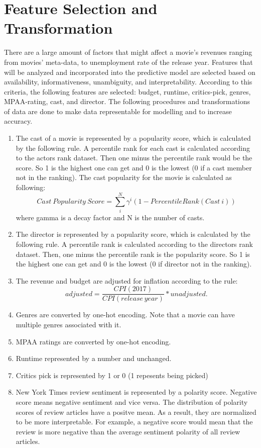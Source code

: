 \documentclass[11pt]{article}
\begin{document}
\section{Feature Selection and
Transformation}\label{feature-selection-and-transformation}

There are a large amount of factors that might affect a movie's revenues
ranging from movies' meta-data, to unemployment rate of the release
year. Features that will be analyzed and incorporated into the
predictive model are selected based on availability, informativeness,
unambiguity, and interpretability. According to this criteria, the
following features are selected: budget, runtime, critics-pick, genres,
MPAA-rating, cast, and director. The following procedures and
transformations of data are done to make data representable for
modelling and to increase accuracy.

\begin{enumerate}
\def\labelenumi{\arabic{enumi})}
\item
  The cast of a movie is represented by a popularity score, which is
  calculated by the following rule. A percentile rank for each
  cast is calculated according to the actors rank dataset. Then one minus the percentile rank would be the score. So 1 is the
  highest one can get and 0 is the lowest (0 if a cast member not in the
  ranking). The cast popularity for the movie is calculated as
  following:
  \[ Cast\ Popularity\ Score = \sum_{i}^{N} \gamma ^ i (1 - Percentile Rank (Cast\ i)) \]
  where gamma is a decay factor and N is the number of casts.
\item
  The director is represented by a popularity score, which is calculated
  by the following rule. A percentile rank is calculated according
  to the directors rank dataset. Then, one minus the percentile rank is the
  popularity score. So 1 is the highest one can get and 0 is the lowest
  (0 if director not in the ranking).
\item
  The revenue and budget are adjusted for inflation according to the
  rule:
  \[ adjusted = \frac{CPI(2017)}{CPI(release  \,year)} * unadjusted. \]
\item
  Genres are converted by one-hot encoding. Note that a movie can have
  multiple genres associated with it.
\item
  MPAA ratings are converted by one-hot encoding.
\item
  Runtime represented by a number and unchanged.
\item
  Critics pick is represented by 1 or 0 (1 repesents being picked)
\item
  New York Times review sentiment is represented by a polarity score.
  Negative score means negative sentiment and vice versa. The
  distribution of polarity scores of review articles have a positve
  mean. As a result, they are normalized to be more interpretable. For
  example, a negative score would mean that the review is more negative
  than the average sentiment polarity of all review articles.
\end{enumerate}
\end{document}
